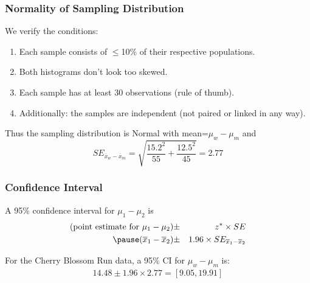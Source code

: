 \documentclass[handout]{beamer}
\newcommand{\blue}[1]{\textcolor{blue2}{#1}}
\newcommand{\xbar}{\overline{x}}
\begin{document}
\begin{frame}[fragile]
\frametitle{Normality of Sampling Distribution}
%
%
We verify the conditions:
\begin{enumerate}
\pause\item Each sample consists of $\leq$10\% of their respective populations.
\pause\item Both histograms don't look too skewed.
\pause\item Each sample has at least 30 observations (rule of thumb).
\pause\item \blue{Additionally}: the samples are independent (not paired or linked in any way).
\end{enumerate}

\pause\vspace{0.25cm}

Thus the sampling distribution is Normal with mean=$\mu_w - \mu_m$ and
\[
SE_{\xbar_w - \xbar_m} = \sqrt{\frac{15.2^2}{55} + \frac{12.5^2}{45}} = 2.77
\]
\end{frame}


\begin{frame}[fragile]
\frametitle{Confidence Interval}
%
%
A 95\% confidence interval for $\mu_1 - \mu_2$ is
\begin{eqnarray*}
(\mbox{point estimate for } \mu_1 - \mu_2) &\pm& z^* \times SE\\
\pause(\xbar_1 - \xbar_2) &\pm& 1.96 \times SE_{\xbar_1 - \xbar_2}
\end{eqnarray*}

\pause\vspace{0.25cm}

\pause For the Cherry Blossom Run data, a 95\% CI for $\mu_w - \mu_m$ is:
\begin{eqnarray*}
14.48 \pm 1.96 \times 2.77 =  [9.05, 19.91]
\end{eqnarray*}
\end{frame}
\end{document}
